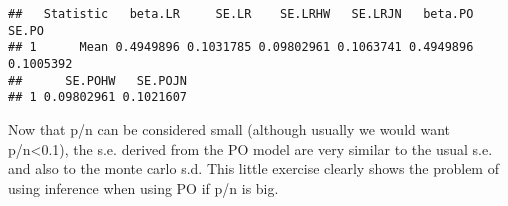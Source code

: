 \documentclass[
]{article}
\begin{document}
\begin{verbatim}
##   Statistic   beta.LR     SE.LR    SE.LRHW   SE.LRJN   beta.PO     SE.PO
## 1      Mean 0.4949896 0.1031785 0.09802961 0.1063741 0.4949896 0.1005392
##      SE.POHW   SE.POJN
## 1 0.09802961 0.1021607
\end{verbatim}

Now that p/n can be considered small (although usually we would want
p/n\textless0.1), the s.e. derived from the PO model are very similar to
the usual s.e. and also to the monte carlo s.d. This little exercise
clearly shows the problem of using inference when using PO if p/n is
big.
\end{document}
